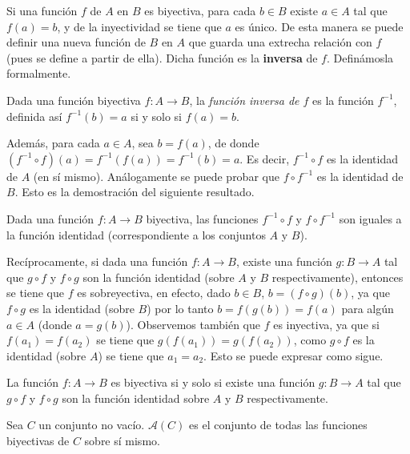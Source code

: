 \documentclass[12pt,]{krantz}
\theoremstyle{definition}
\theoremstyle{definition}
\theoremstyle{definition}
\theoremstyle{remark}
\let\BeginKnitrBlock\begin \let\EndKnitrBlock\end
\begin{document}
Si una función \(f\) de \(A\) en \(B\) es biyectiva, para cada
\(b\in B\) existe \(a\in A\) tal que \(f(a)=b\), y de la inyectividad se
tiene que \(a\) es único. De esta manera se puede definir una nueva
función de \(B\) en \(A\) que guarda una extrecha relación con \(f\)
(pues se define a partir de ella). Dicha función es la \textbf{inversa}
de \(f\). Definámosla formalmente.

\BeginKnitrBlock{definition}
\protect\hypertarget{def:unnamed-chunk-40}{}{\label{def:unnamed-chunk-40}
}Dada una función biyectiva \(f: A \longrightarrow B\), la
\textit{función inversa de $f$} es la función \(f^{-1}\), definida así
\(f^{-1}(b)=a\) si y solo si \(f(a)=b\).
\EndKnitrBlock{definition}

Además, para cada \(a\in A\), sea \(b=f(a)\), de donde
\((f^{-1}\circ f)(a)=f^{-1}(f(a))=f^{-1}(b)=a\). Es decir,
\(f^{-1}\circ f\) es la identidad de \(A\) (en sí mismo). Análogamente
se puede probar que \(f\circ f^{-1}\) es la identidad de \(B\). Esto es
la demostración del siguiente resultado.

\BeginKnitrBlock{lemma}
\protect\hypertarget{lem:unnamed-chunk-41}{}{\label{lem:unnamed-chunk-41}
}Dada una función \(f:A\longrightarrow B\) biyectiva, las funciones
\(f^{-1}\circ f\) y \(f\circ f^{-1}\) son iguales a la función identidad
(correspondiente a los conjuntos \(A\) y \(B\)).
\EndKnitrBlock{lemma}

Recíprocamente, si dada una función \(f: A\longrightarrow B\), existe
una función \(g:B\longrightarrow A\) tal que \(g\circ f\) y \(f\circ g\)
son la función identidad (sobre \(A\) y \(B\) respectivamente), entonces
se tiene que \(f\) es sobreyectiva, en efecto, dado \(b\in B\),
\(b=(f\circ g)(b)\), ya que \(f\circ g\) es la identidad (sobre \(B\))
por lo tanto \(b=f(g(b))=f(a)\) para algún \(a\in A\) (donde
\(a=g(b)\)). Observemos también que \(f\) es inyectiva, ya que si
\(f(a_{1})=f(a_{2})\) se tiene que \(g(f(a_{1}))=g(f(a_{2}))\), como
\(g\circ f\) es la identidad (sobre \(A\)) se tiene que \(a_{1}=a_{2}\).
Esto se puede expresar como sigue.

\BeginKnitrBlock{lemma}
\protect\hypertarget{lem:unnamed-chunk-42}{}{\label{lem:unnamed-chunk-42}
}La función \(f:A\longrightarrow B\) es biyectiva si y solo si existe
una función \(g:B\longrightarrow A\) tal que \(g\circ f\) y \(f\circ g\)
son la función identidad sobre \(A\) y \(B\) respectivamente.
\EndKnitrBlock{lemma}

\BeginKnitrBlock{definition}
\protect\hypertarget{def:unnamed-chunk-43}{}{\label{def:unnamed-chunk-43}
}Sea \(C\) un conjunto no vacío. \(\mathcal{A}(C)\) es el conjunto de
todas las funciones biyectivas de \(C\) sobre sí mismo.
\EndKnitrBlock{definition}
\end{document}
